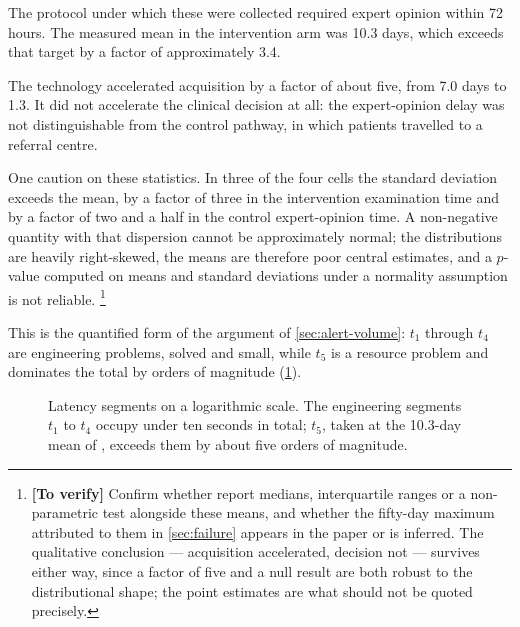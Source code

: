 \documentclass[12pt,a4paper,oneside]{report}
\newcommand{\verify}[1]{\footnote{\textbf{[To verify]} #1}}
\begin{document}
The protocol under which these were collected required expert opinion within 72 hours. The measured mean in the intervention arm was 10.3 days, which exceeds that target by a factor of approximately 3.4.

The technology accelerated acquisition by a factor of about five, from 7.0 days to 1.3. It did not accelerate the clinical decision at all: the expert-opinion delay was not distinguishable from the control pathway, in which patients travelled to a referral centre.

One caution on these statistics. In three of the four cells the standard deviation exceeds the mean, by a factor of three in the intervention examination time and by a factor of two and a half in the control expert-opinion time. A non-negative quantity with that dispersion cannot be approximately normal; the distributions are heavily right-skewed, the means are therefore poor central estimates, and a $p$-value computed on means and standard deviations under a normality assumption is not reliable.%
\verify{Confirm whether \textcite{bediang2021} report medians, interquartile ranges or a non-parametric test alongside these means, and whether the fifty-day maximum attributed to them in \cref{sec:failure} appears in the paper or is inferred. The qualitative conclusion --- acquisition accelerated, decision not --- survives either way, since a factor of five and a null result are both robust to the distributional shape; the point estimates are what should not be quoted precisely.}

This is the quantified form of the argument of \cref{sec:alert-volume}: $t_1$ through $t_4$ are engineering problems, solved and small, while $t_5$ is a resource problem and dominates the total by orders of magnitude (\cref{fig:latency}).

\begin{figure}[htbp]
\centering
{}
\caption{Latency segments on a logarithmic scale. The engineering segments $t_1$ to $t_4$ occupy under ten seconds in total; $t_5$, taken at the 10.3-day mean of \textcite{bediang2021}, exceeds them by about five orders of magnitude.}\label{fig:latency}
\end{figure}
\end{document}
